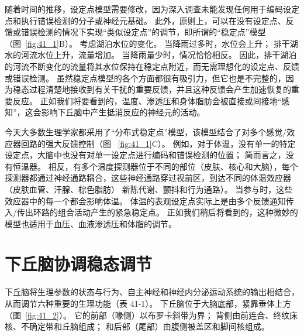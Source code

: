 随着时间的推移，设定点模型需要修改，因为深入调查未能发现任何用于编码设定点和执行错误检测的分子或神经元基础。
此外，原则上，可以在没有设定点、反馈或错误检测的情况下实现“类似设定点”的调节，即所谓的“稳定点”模型（图~\ref{fig:41_1}B）。
考虑湖泊水位的变化。 当降雨过多时，水位会上升； 排干湖水的河流水位上升，流量增加。
当降雨量少时，情况恰恰相反。
因此，排干湖泊的河流不断变化的流量将其水位保持在稳定点附近，而无需理想化的设定点、反馈或错误检测。
虽然稳定点模型的各个方面都很有吸引力，但它也是不完整的，因为稳态过程清楚地接收到有关干扰的重要反馈，并且这种反馈会产生加速恢复的重要反应。
正如我们将要看到的，温度、渗透压和身体脂肪会被直接或间接地“感知”，这会影响下丘脑中产生抵消反应的神经元的活动。


今天大多数生理学家都采用了“分布式稳定点”模型，该模型结合了对多个感觉/效应器回路的强大反馈控制（图 ~\ref{fig:41_1}C）。
例如，对于体温，没有单一的特定设定点，大脑中也没有对单一设定点进行编码和错误检测的位置；
简而言之，没有恒温器。
相反，有多个温度探测器位于不同的部位（皮肤、核心和大脑），每个探测器都通过神经通路耦合，这些神经通路穿过视前区，到达不同的体温效应器（皮肤血管、汗腺、棕色脂肪） 新陈代谢、颤抖和行为通路）。
当参与时，这些效应器中的每一个都会影响体温。
体温的表观设定点实际上是由多个反馈通知传入/传出环路的组合活动产生的紧急稳定点。
正如我们稍后将看到的，这种微妙的模型也适用于血压、血液渗透压和体脂的调节。



\section{下丘脑协调稳态调节}

下丘脑将生理参数的状态与行为、自主神经和神经内分泌运动系统的输出相结合，从而调节六种重要的生理功能（表 41-1）。
下丘脑位于大脑底部，紧靠垂体上方（图~\ref{fig:41_2}）。
它的前部（喙侧）以布罗卡斜带为界； 背侧由前连合、终纹床核、不确定带和丘脑组成；
和后部（尾部）由腹侧被盖区和脚间核组成。


